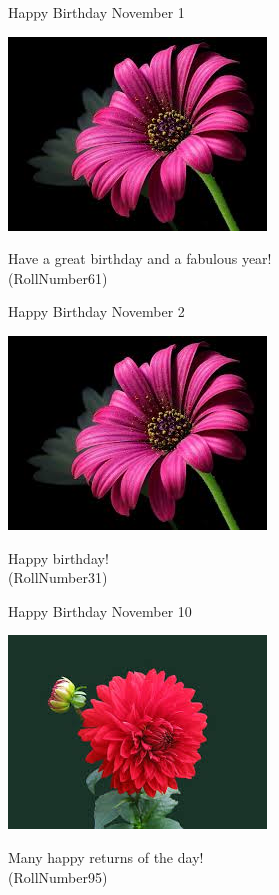\documentclass[table, landscape]{beamer}
\begin{document}
\begin{frame}{\color{red}Happy Birthday }
{November 1}
\begin{center}
\includegraphics[height=0.5\textheight]{flowers/f2.jpeg}

Have a great birthday and a fabulous year! \\ \vspace{0.5cm}{\Large name54} (RollNumber61)
\end{center}
\end{frame}
\begin{frame}{\color{blue}Happy Birthday }
{November 2}
\begin{center}
\includegraphics[height=0.5\textheight]{flowers/f2.jpeg}

Happy birthday! \\ \vspace{0.5cm}{\Large name26} (RollNumber31)
\end{center}
\end{frame}
\begin{frame}{\color{red}Happy Birthday }
{November 10}
\begin{center}
\includegraphics[height=0.5\textheight]{flowers/f1.jpeg}

Many happy returns of the day! \\ \vspace{0.5cm}{\Large name88} (RollNumber95)
\end{center}
\end{frame}
\end{document}
